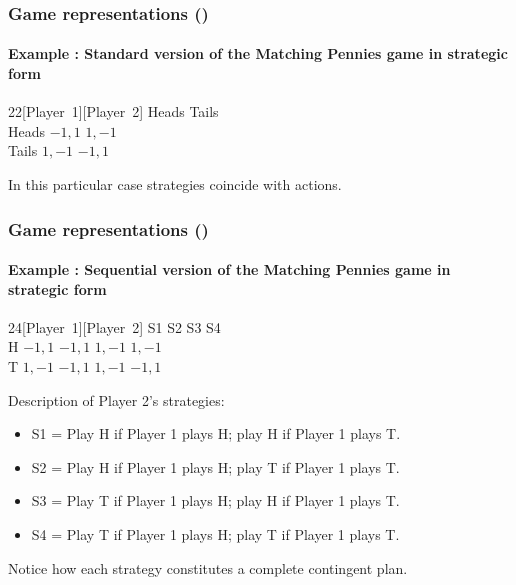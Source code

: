 \documentclass[10pt]{beamer}
\theoremstyle{definition}
\begin{document}
\begin{frame}[fragile]
\frametitle{Game representations ()}
\framesubtitle{Example : Standard version of the Matching Pennies game in strategic form}
\begin{center}
\begin{game}{2}{2}[Player~1][Player~2]
 \> Heads \> Tails \\
Heads \> $ -1,1 $ \> $ 1,-1 $ \\
Tails \> $ 1,-1 $ \> $ -1,1 $
\end{game}
\end{center}\bigskip

\begin{itemize}{\small
\item In this particular case strategies coincide with actions.
}
\end{itemize}
\end{frame}



\begin{frame}[fragile]
\frametitle{Game representations ()}
\framesubtitle{Example : Sequential version of the Matching Pennies game in strategic form}
\begin{center}
\begin{game}{2}{4}[Player~1][Player~2]
 \> S1 \> S2 \> S3 \> S4 \\
H \> $ -1,1 $ \> $ -1,1 $ \> $ 1,-1 $ \> $ 1,-1 $\\
T \> $ 1,-1 $ \> $ -1,1 $ \> $ 1,-1 $ \> $ -1,1 $
\end{game}
\end{center}\bigskip

\begin{itemize}{\small
\item Description of Player 2's strategies:
	\begin{itemize}
		\item S1 = Play H if Player 1 plays H; play H if Player 1 plays T.
		\item S2 = Play H if Player 1 plays H; play T if Player 1 plays T.
		\item S3 = Play T if Player 1 plays H; play H if Player 1 plays T.
		\item S4 = Play T if Player 1 plays H; play T if Player 1 plays T.
	\end{itemize}
\item Notice how each strategy constitutes a complete contingent plan.
}
\end{itemize}
\end{frame}
\end{document}
